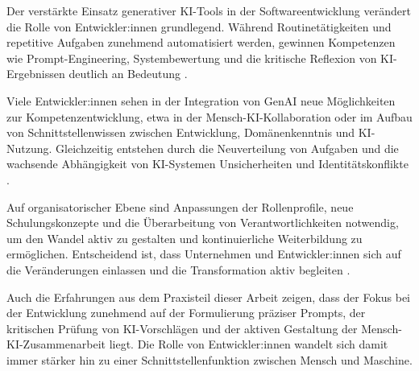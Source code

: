 
Der verstärkte Einsatz generativer KI-Tools in der Softwareentwicklung
verändert die Rolle von Entwickler:innen grundlegend. Während
Routinetätigkeiten und repetitive Aufgaben zunehmend automatisiert werden,
gewinnen Kompetenzen wie Prompt-Engineering, Systembewertung und die kritische
Reflexion von KI-Ergebnissen deutlich an Bedeutung
\cite{schmitt_generative_2024}.

Viele Entwickler:innen sehen in der Integration von GenAI neue Möglichkeiten
zur Kompetenzentwicklung, etwa in der Mensch-KI-Kollaboration oder im Aufbau
von Schnittstellenwissen zwischen Entwicklung, Domänenkenntnis und KI-Nutzung.
Gleichzeitig entstehen durch die Neuverteilung von Aufgaben und die wachsende
Abhängigkeit von KI-Systemen Unsicherheiten und Identitätskonflikte
\cite{schmitt_generative_2024}.

Auf organisatorischer Ebene sind Anpassungen der Rollenprofile, neue
Schulungskonzepte und die Überarbeitung von Verantwortlichkeiten notwendig, um
den Wandel aktiv zu gestalten und kontinuierliche Weiterbildung zu ermöglichen.
Entscheidend ist, dass Unternehmen und Entwickler:innen sich auf die
Veränderungen einlassen und die Transformation aktiv begleiten
\cite{nguyen-duc_generative_2023}.

Auch die Erfahrungen aus dem Praxisteil dieser Arbeit zeigen, dass der Fokus
bei der Entwicklung zunehmend auf der Formulierung präziser Prompts, der
kritischen Prüfung von KI-Vorschlägen und der aktiven Gestaltung der
Mensch-KI-Zusammenarbeit liegt. Die Rolle von Entwickler:innen wandelt sich
damit immer stärker hin zu einer Schnittstellenfunktion zwischen Mensch und
Maschine.
